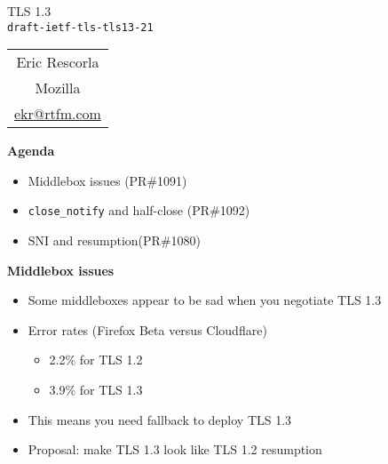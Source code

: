 \documentclass[helvetica]{seminar}
\newcommand{\heading}[1]{%
  \begin{center} 
    \large\bf 
    #1 
  \end{center} 
  \vspace{.4 in}}
\begin{document}
\begin{slide}
\begin{center}
\vspace{.5 in}
\LARGE{{\bf}TLS 1.3\\{\small \verb^draft-ietf-tls-tls13-21^}}\\
\vspace{.2in}
\large{
\begin{tabular}{c}
Eric Rescorla\\
Mozilla\\
\url{ekr@rtfm.com}
\end{tabular}
}
\end{center}
\end{slide}

\centerslidesfalse 

\begin{slide}
  \heading{Agenda}

  \begin{itemize}
  \item Middlebox issues (PR\#1091)
  \item \verb^close_notify^ and half-close (PR\#1092)
  \item SNI and resumption(PR\#1080)
  \end{itemize}
\end{slide}


\begin{slide}
  \heading{Middlebox issues}

  \begin{itemize}
  \item Some middleboxes appear to be sad when you negotiate TLS 1.3
  \item Error rates (Firefox Beta versus Cloudflare)
    \begin{itemize}
    \item 2.2\% for TLS 1.2
    \item 3.9\% for TLS 1.3
    \end{itemize}
  \item This means you need fallback to deploy TLS 1.3
  \item Proposal: make TLS 1.3 look like TLS 1.2 resumption
  \end{itemize}
\end{slide}
\end{document}
